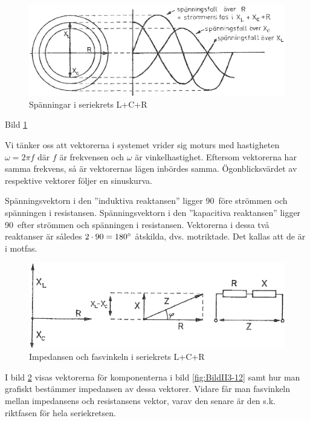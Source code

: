 \begin{figure}
\includegraphics[width=\textwidth]{images/cropped_pdfs/bild_2_3-13.pdf}
\caption{Spänningar i seriekrets L+C+R}
\label{fig:BildII3-13}
\end{figure}

Bild \ref{fig:BildII3-13}

Vi tänker oss att vektorerna i systemet vrider sig moturs med hastigheten
\(\omega = 2\pi f\) där \(f\) är frekvensen och \(\omega\) är vinkelhastighet.
Eftersom vektorerna har samma frekvens, så är vektorernas lägen inbördes samma.
Ögonblicksvärdet av respektive vektorer följer en sinuskurva.

Spänningsvektorn i den ''induktiva reaktansen'' ligger 90\degree~före strömmen
och spänningen i resistansen.
Spänningsvektorn i den ''kapacitiva reaktansen'' ligger 90\degree~efter
strömmen och spänningen i resistansen.
Vektorerna i dessa två reaktanser är således \(2 \cdot 90 = 180\degree\)
åtskilda, dvs. motriktade.
Det kallas att de är i motfas.

\begin{figure}
\includegraphics[width=\textwidth]{images/cropped_pdfs/bild_2_3-14.pdf}
\caption{Impedansen och fasvinkeln i seriekrets L+C+R}
\label{fig:BildII3-14}
\end{figure}

I bild \ref{fig:BildII3-14} visas vektorerna för komponenterna i bild
\ref{fig:BildII3-12} samt hur man grafiskt bestämmer impedansen av dessa
vektorer.
Vidare får man fasvinkeln mellan impedansens och resistansens vektor, varav den
senare är den s.k. riktfasen för hela seriekretsen.

